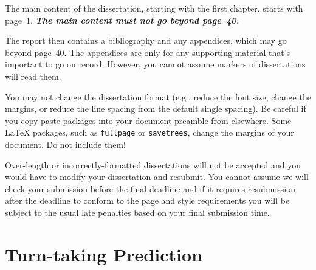 \documentclass[logo,bsc,singlespacing,parskip]{infthesis}
\begin{document}
The main content of the dissertation, starting with the first chapter,
starts with page~1. \emph{\textbf{The main content must not go beyond page~40.}}

The report then contains a bibliography and any appendices, which may go beyond
page~40. The appendices are only for any supporting material that's important to
go on record. However, you cannot assume markers of dissertations will read them.

You may not change the dissertation format (e.g., reduce the font size, change
the margins, or reduce the line spacing from the default single spacing). Be
careful if you copy-paste packages into your document preamble from elsewhere.
Some \LaTeX{} packages, such as \texttt{fullpage} or \texttt{savetrees}, change
the margins of your document. Do not include them!

Over-length or incorrectly-formatted dissertations will not be accepted and you
would have to modify your dissertation and resubmit. You cannot assume we will
check your submission before the final deadline and if it requires resubmission
after the deadline to conform to the page and style requirements you will be
subject to the usual late penalties based on your final submission time.

\section{Turn-taking Prediction}
\end{document}
